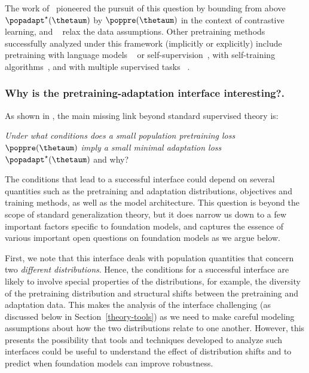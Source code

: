 The work of~\citet{arora2019theoretical} pioneered the pursuit of this question by bounding from above $\popadapt^\star(\thetaum)$ by $\poppre(\thetaum)$ in the context of contrastive learning, and ~\citet{haochen2021spectral,tosh2020contrastive,tosh2021contrastive} relax the data assumptions. Other pretraining methods successfully analyzed under this framework (implicitly or explicitly) include pretraining with language models ~\cite{wei2021pretrained} or self-supervision~\cite{lee2020predicting}, with self-training algorithms~\cite{wei2020theoretical,cai2021theory}, and with multiple supervised tasks ~\cite{tripuraneni2020theory,du2020fewshot}. 

\subsubsection{Why is the pretraining-adaptation interface interesting?.}
\label{sec:theory-interface}
As shown in , the main missing link beyond standard supervised theory is:

\begin{center}
    \emph{Under what conditions does a small population pretraining loss $\poppre(\thetaum)$ imply a small minimal adaptation loss $\popadapt^\star(\thetaum)$} and why?
\end{center}

The conditions that lead to a successful interface could depend on several quantities such as the pretraining and adaptation distributions, objectives and training methods, as well as the model architecture. This question is beyond the scope of standard generalization theory, but it does narrow us down to a few important factors specific to foundation models, and captures the essence of various important open questions on foundation models as we argue below.  

First, we note that this interface deals with population quantities that concern two \emph{different distributions}. Hence, the conditions for a successful interface are likely to involve special properties of the distributions, for example, the diversity of the pretraining distribution and structural shifts between the pretraining and adaptation data. This makes the analysis of the interface challenging (as discussed below in Section~\ref{theory-tools}) as we need to make careful modeling assumptions about how the two distributions relate to one another. However, this presents the possibility that tools and techniques developed to analyze such interfaces could be useful to understand the effect of distribution shifts and to predict when foundation models can improve robustness. 

